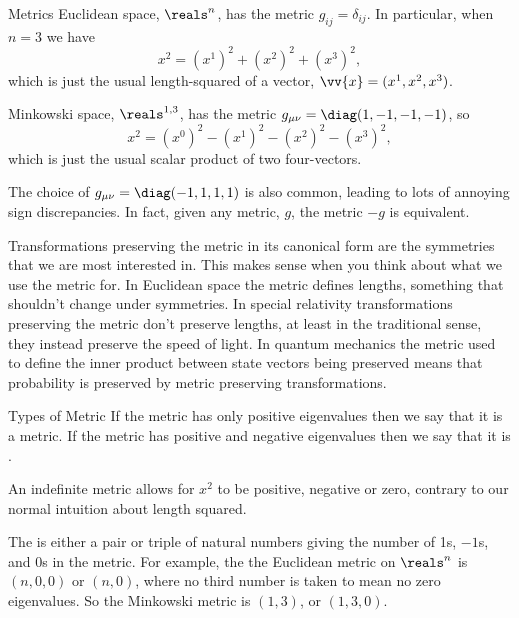 \documentclass[fleqn]{NotesClass}
\newcommand{\minkowskiSpace}{\reals^{1,3}}
\begin{document}
    \begin{exm}{Metrics}{}
        Euclidean space, \(\reals^n\), has the metric \(g_{ij} = \delta_{ij}\).
        In particular, when \(n = 3\) we have
        \begin{equation}
            x^2 = (x^1)^2 + (x^2)^2 + (x^3)^2,
        \end{equation}
        which is just the usual length-squared of a vector, \(\vv{x} = (x^1, x^2, x^3)\).
        
        Minkowski space, \(\minkowskiSpace\), has the metric \(g_{\mu\nu} = \diag(1, -1, -1, -1)\), so
        \begin{equation}
            x^2 = (x^0)^2 - (x^1)^2 - (x^2)^2 - (x^3)^2,
        \end{equation}
        which is just the usual scalar product of two four-vectors.
        \begin{wrn}
            The choice of \(g_{\mu\nu} = \diag(-1, 1, 1, 1)\) is also common, leading to lots of annoying sign discrepancies.
            In fact, given any metric, \(g\), the metric \(-g\) is equivalent.
        \end{wrn}
    \end{exm}
    
    Transformations preserving the metric in its canonical form are the symmetries that we are most interested in.
    This makes sense when you think about what we use the metric for.
    In Euclidean space the metric defines lengths, something that shouldn't change under symmetries.
    In special relativity transformations preserving the metric don't preserve lengths, at least in the traditional sense, they instead preserve the speed of light.
    In quantum mechanics the metric used to define the inner product between state vectors being preserved means that probability is preserved by metric preserving transformations.
    
    \begin{dfn}{Types of Metric}{}
        If the metric has only positive eigenvalues then we say that it is a  metric.
        If the metric has positive and negative eigenvalues then we say that it is .
    \end{dfn}
    
    An indefinite metric allows for \(x^2\) to be positive, negative or zero, contrary to our normal intuition about length squared.
    
    The  is either a pair or triple of natural numbers giving the number of 1s, \(-1\)s, and 0s in the metric.
    For example, the the Euclidean metric on \(\reals^n\) is \((n, 0, 0)\) or \((n, 0)\), where no third number is taken to mean no zero eigenvalues.
    So the Minkowski metric is \((1, 3)\), or \((1, 3, 0)\).
    
\end{document}
